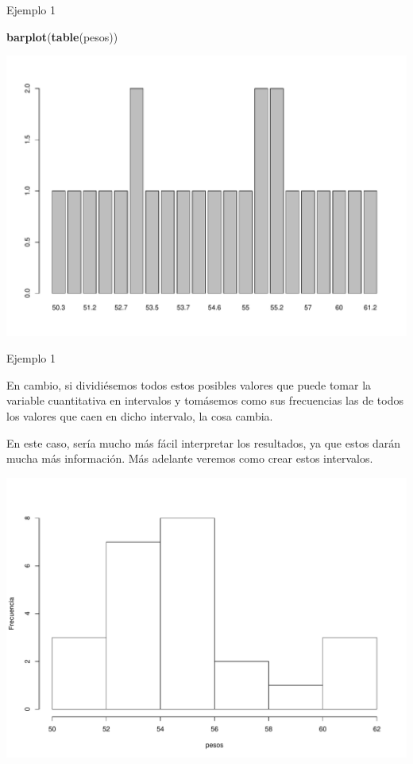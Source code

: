 \documentclass[
  ignorenonframetext,
]{beamer}
\newenvironment{Shaded}{\begin{snugshade}}{\end{snugshade}}
\newcommand{\KeywordTok}[1]{\textcolor[rgb]{0.13,0.29,0.53}{\textbf{#1}}}
\newcommand{\NormalTok}[1]{#1}
\begin{document}
\begin{frame}[fragile]{Ejemplo 1}
\protect\hypertarget{ejemplo-1-1}{}

\begin{Shaded}
\begin{Highlighting}[]
\KeywordTok{barplot}\NormalTok{(}\KeywordTok{table}\NormalTok{(pesos))}
\end{Highlighting}
\end{Shaded}

\includegraphics{Tema9.-Agrupacion_datos_cuantitativos_files/figure-beamer/unnamed-chunk-2-1.pdf}

\end{frame}

\begin{frame}{Ejemplo 1}
\protect\hypertarget{ejemplo-1-2}{}

En cambio, si dividiésemos todos estos posibles valores que puede tomar
la variable cuantitativa en intervalos y tomásemos como sus frecuencias
las de todos los valores que caen en dicho intervalo, la cosa cambia.

En este caso, sería mucho más fácil interpretar los resultados, ya que
estos darán mucha más información. Más adelante veremos como crear estos
intervalos.

\includegraphics{Tema9.-Agrupacion_datos_cuantitativos_files/figure-beamer/unnamed-chunk-3-1.pdf}

\end{frame}
\end{document}
